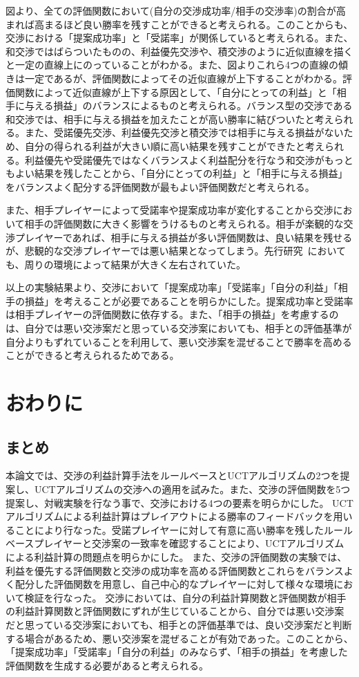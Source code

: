 \documentclass[a4, 10pt,dvipdfmx]{jsarticle}
\begin{document}
図より、全ての評価関数において(自分の交渉成功率/相手の交渉率)の割合が高まれば高まるほど良い勝率を残すことができると考えられる。このことからも、交渉における「提案成功率」と「受諾率」が関係していると考えられる。また、和交渉ではばらついたものの、利益優先交渉や、積交渉のように近似直線を描くと一定の直線上にのっていることがわかる。また、図よりこれら4つの直線の傾きは一定であるが、評価関数によってその近似直線が上下することがわかる。評価関数によって近似直線が上下する原因として、「自分にとっての利益」と「相手に与える損益」のバランスによるものと考えられる。バランス型の交渉である和交渉では、相手に与える損益を加えたことが高い勝率に結びついたと考えられる。また、受諾優先交渉、利益優先交渉と積交渉では相手に与える損益がないため、自分の得られる利益が大きい順に高い結果を残すことができたと考えられる。利益優先や受諾優先ではなくバランスよく利益配分を行なう和交渉がもっともよい結果を残したことから、「自分にとっての利益」と「相手に与える損益」をバランスよく配分する評価関数が最もよい評価関数だと考えられる。

また、相手プレイヤーによって受諾率や提案成功率が変化することから交渉において相手の評価関数に大きく影響をうけるものと考えられる。相手が楽観的な交渉プレイヤーであれば、相手に与える損益が多い評価関数は、良い結果を残せるが、悲観的な交渉プレイヤーでは悪い結果となってしまう。先行研究~\cite{ito2012complex}においても、周りの環境によって結果が大きく左右されていた。

以上の実験結果より、交渉において「提案成功率」「受諾率」「自分の利益」「相手の損益」を考えることが必要であることを明らかにした。提案成功率と受諾率は相手プレイヤーの評価関数に依存する。また、「相手の損益」を考慮するのは、自分では悪い交渉案だと思っている交渉案においても、相手との評価基準が自分よりもずれていることを利用して、悪い交渉案を混ぜることで勝率を高めることができると考えられるためである。

\section{おわりに}
\subsection{まとめ}
本論文では、交渉の利益計算手法をルールベースとUCTアルゴリズムの2つを提案し、UCTアルゴリズムの交渉への適用を試みた。また、交渉の評価関数を5つ提案し、対戦実験を行なう事で、交渉における4つの要素を明らかにした。
UCTアルゴリズムによる利益計算はプレイアウトによる勝率のフィードバックを用いることにより行なった。受諾プレイヤーに対して有意に高い勝率を残したルールベースプレイヤーと交渉案の一致率を確認することにより、UCTアルゴリズムによる利益計算の問題点を明らかにした。
また、交渉の評価関数の実験では、利益を優先する評価関数と交渉の成功率を高める評価関数とこれらをバランスよく配分した評価関数を用意し、自己中心的なプレイヤーに対して様々な環境において検証を行なった。
交渉においては、自分の利益計算関数と評価関数が相手の利益計算関数と評価関数にずれが生じていることから、自分では悪い交渉案だと思っている交渉案においても、相手との評価基準では、良い交渉案だと判断する場合があるため、悪い交渉案を混ぜることが有効であった。このことから、「提案成功率」「受諾率」「自分の利益」のみならず、「相手の損益」を考慮した評価関数を生成する必要があると考えられる。
\end{document}
